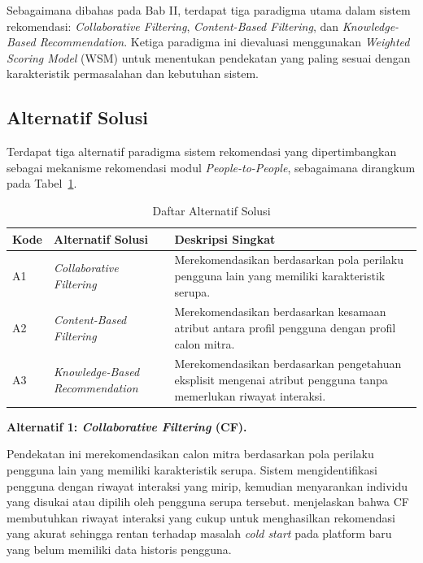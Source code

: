 Sebagaimana dibahas pada Bab II, terdapat tiga paradigma utama dalam sistem rekomendasi: \emph{Collaborative Filtering}, \emph{Content-Based Filtering}, dan \emph{Knowledge-Based Recommendation}. Ketiga paradigma ini dievaluasi menggunakan \emph{Weighted Scoring Model} (WSM) untuk menentukan pendekatan yang paling sesuai dengan karakteristik permasalahan dan kebutuhan sistem.

\subsection{Alternatif Solusi}

Terdapat tiga alternatif paradigma sistem rekomendasi yang dipertimbangkan sebagai mekanisme rekomendasi modul \emph{People-to-People}, sebagaimana dirangkum pada Tabel~\ref{tab:alternatif-solusi}.

\begin{table}[H]
  \caption{Daftar Alternatif Solusi}
  \label{tab:alternatif-solusi}
  \begin{tabularx}{\textwidth}{p{1cm} p{4.5cm} X}
    \toprule
    \textbf{Kode} & \textbf{Alternatif Solusi} & \textbf{Deskripsi Singkat} \\
    \midrule
    A1 & \emph{Collaborative Filtering} & Merekomendasikan berdasarkan pola perilaku pengguna lain yang memiliki karakteristik serupa. \\
    \midrule
    A2 & \emph{Content-Based Filtering} & Merekomendasikan berdasarkan kesamaan atribut antara profil pengguna dengan profil calon mitra. \\
    \midrule
    A3 & \emph{Knowledge-Based Recommendation} & Merekomendasikan berdasarkan pengetahuan eksplisit mengenai atribut pengguna tanpa memerlukan riwayat interaksi. \\
    \bottomrule
  \end{tabularx}
\end{table}

\textbf{Alternatif 1: \emph{Collaborative Filtering} (CF).}

Pendekatan ini merekomendasikan calon mitra berdasarkan pola perilaku pengguna lain yang memiliki karakteristik serupa. Sistem mengidentifikasi pengguna dengan riwayat interaksi yang mirip, kemudian menyarankan individu yang disukai atau dipilih oleh pengguna serupa tersebut. \textcite{adomavicius2005} menjelaskan bahwa CF membutuhkan riwayat interaksi yang cukup untuk menghasilkan rekomendasi yang akurat sehingga rentan terhadap masalah \emph{cold start} pada platform baru yang belum memiliki data historis pengguna.

